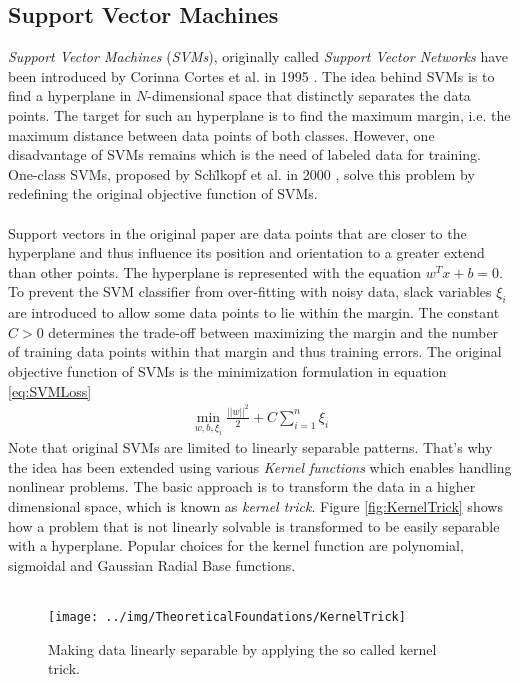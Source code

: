 \subsection{Support Vector Machines}
\label{subsec:SVM}
\textit{Support Vector Machines} (\textit{SVMs}), originally called \textit{Support Vector Networks} have been introduced by Corinna Cortes et al. in 1995 \cite{SVM}. The idea behind SVMs is to find a hyperplane in $N$-dimensional space that distinctly separates the data points. The target for such an hyperplane is to find the maximum margin, i.e. the maximum distance between data points of both classes. However, one disadvantage of SVMs remains which is the need of labeled data for training. One-class SVMs, proposed by Sch\"lkopf et al. in 2000 \cite{OCSVM}, solve this problem by redefining the original objective function of SVMs.\\
\\
Support vectors in the original paper are data points that are closer to the hyperplane and thus influence its position and orientation to a greater extend than other points. The hyperplane is represented with the equation $w^Tx+b=0$. To prevent the SVM classifier from over-fitting with noisy data, slack variables $\xi_i$ are introduced to allow some data points to lie within the margin. The constant $C>0$ determines the trade-off between maximizing the margin and the number of training data points within that margin and thus training errors. The original objective function of SVMs is the minimization formulation in equation \ref{eq:SVMLoss}
\begin{align}
\label{eq:SVMLoss}
\min_{w, b, \xi_i}\frac{||w||^2}{2}+C\sum_{i=1}^n\xi_i
\end{align}
Note that original SVMs are limited to linearly separable patterns. That's why the idea has been extended using various \textit{Kernel functions} which enables handling nonlinear problems. The basic approach is to transform the data in a higher dimensional space, which is known as \textit{kernel trick}. Figure \ref{fig:KernelTrick} shows how a problem that is not linearly solvable is transformed to be easily separable with a hyperplane. Popular choices for the kernel function are polynomial, sigmoidal and Gaussian Radial Base functions.\\
\\
\begin{figure}[H]
\centering
\texttt{[image: ../img/TheoreticalFoundations/KernelTrick]}
\caption{Making data linearly separable by applying the so called kernel trick.}
\label{fig:DBSCAN1}
\end{figure}


